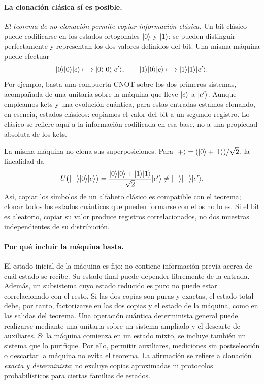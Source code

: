 \documentclass[letterpaper,12pt]{article}
\numberwithin{equation}{section}
\begin{document}
\paragraph{La clonación clásica sí es posible.}
\emph{El teorema de no clonación permite copiar información clásica.}
Un bit clásico puede codificarse en los estados ortogonales ${\vert 0 \rangle}$ y
${\vert 1 \rangle}$: se pueden distinguir perfectamente y representan los dos
valores definidos del bit. Una misma máquina puede efectuar
\[
  {\vert 0 \rangle}{\vert 0 \rangle}{\vert e \rangle}\longmapsto{\vert 0 \rangle}{\vert 0 \rangle}{\vert e' \rangle},
  \qquad
  {\vert 1 \rangle}{\vert 0 \rangle}{\vert e \rangle}\longmapsto{\vert 1 \rangle}{\vert 1 \rangle}{\vert e' \rangle}.
\]
Por ejemplo, basta una compuerta CNOT sobre los dos primeros sistemas,
acompañada de una unitaria sobre la máquina que lleve ${\vert e \rangle}$ a
${\vert e' \rangle}$. Aunque empleamos kets y una evolución cuántica, para estas
entradas estamos clonando, en esencia, estados clásicos: copiamos el valor
del bit a un segundo registro. Lo clásico se refiere aquí a la información
codificada en esa base, no a una propiedad absoluta de los kets.

La misma máquina no clona sus superposiciones. Para
${\vert + \rangle}=({\vert 0 \rangle}+{\vert 1 \rangle})/\sqrt2$, la linealidad da
\[
  U\bigl({\vert + \rangle}{\vert 0 \rangle}{\vert e \rangle}\bigr)
  =\frac{{\vert 0 \rangle}{\vert 0 \rangle}+{\vert 1 \rangle}{\vert 1 \rangle}}{\sqrt2}{\vert e' \rangle}
  \neq{\vert + \rangle}{\vert + \rangle}{\vert e' \rangle}.
\]
Así, copiar los símbolos de un alfabeto clásico es compatible con el
teorema; clonar todos los estados cuánticos que pueden formarse con ellos
no lo es. Si el bit es aleatorio, copiar su valor produce registros
correlacionados, no dos muestras independientes de su distribución.

\paragraph{Por qué incluir la máquina basta.}
El estado inicial de la máquina es fijo: no contiene información previa
acerca de cuál estado se recibe. Su estado final puede depender libremente
de la entrada. Además, un subsistema cuyo estado reducido es puro no puede
estar correlacionado con el resto. Si las dos copias son puras y exactas,
el estado total debe, por tanto, factorizarse en las dos copias y el estado
de la máquina, como en las salidas del teorema.
Una operación cuántica determinista general puede realizarse mediante una
unitaria sobre un sistema ampliado y el descarte de auxiliares. Si la
máquina comienza en un estado mixto, se incluye también un sistema que lo
purifique. Por ello, permitir auxiliares, mediciones sin postselección o
descartar la máquina no evita el teorema. La afirmación se refiere a
clonación \emph{exacta y determinista}; no excluye copias aproximadas ni
protocolos probabilísticos para ciertas familias de estados.
\end{document}
